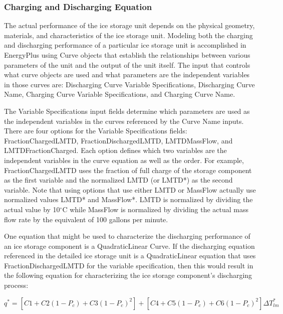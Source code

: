 \subsubsection{Charging and Discharging Equation}\label{charging-and-discharging-equation}

The actual performance of the ice storage unit depends on the physical geometry, materials, and characteristics of the ice storage unit. Modeling both the charging and discharging performance of a particular ice storage unit is accomplished in EnergyPlus using Curve objects that establish the relationships between various parameters of the unit and the output of the unit itself. The input that controls what curve objects are used and what parameters are the independent variables in those curves are: Discharging Curve Variable Specifications, Discharging Curve Name, Charging Curve Variable Specifications, and Charging Curve Name.

The Variable Specifications input fields determine which parameters are used as the independent variables in the curves referenced by the Curve Name inputs.  There are four options for the Variable Specifications fields: FractionChargedLMTD, FractionDischargedLMTD, LMTDMassFlow, and LMTDFractionCharged.  Each option defines which two variables are the independent variables in the curve equation as well as the order.  For example, FractionChargedLMTD uses the fraction of full charge of the storage component as the first variable and the normalized LMTD (or LMTD*) as the second variable.  Note that using options that use either LMTD or MassFlow actually use normalized values LMTD* and MassFlow*.  LMTD is normalized by dividing the actual value by 10\(^{\circ}\)C while MassFlow is normalized by dividing the actual mass flow rate by the equivalent of 100 gallons per minute.  

One equation that might be used to characterize the discharging performance of an ice storage component is a QuadraticLinear Curve.  If the discharging equation referenced in the detailed ice storage unit is a QuadraticLinear equation that uses FractionDischargedLMTD for the variable specification, then this would result in the following equation for characterizing the ice storage component's discharging process:

\begin{equation}
{q^*} = \left[ {C1 + C2\left( {1 - {P_c}} \right) + C3{{\left( {1 - {P_c}} \right)}^2}} \right] + \left[ {C4 + C5\left( {1 - {P_c}} \right) + C6{{\left( {1 - {P_c}} \right)}^2}} \right]\Delta T_{lm}^*
\end{equation}

